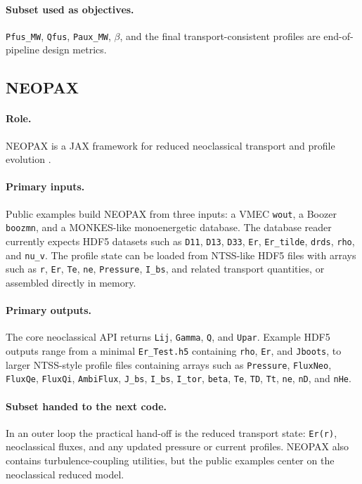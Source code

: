 \documentclass[11pt]{article}
\newcommand{\code}[1]{\texttt{#1}}
\begin{document}
\paragraph{Subset used as objectives.}
\code{Pfus\_MW}, \code{Qfus}, \code{Paux\_MW}, \(\beta\), and the final
transport-consistent profiles are end-of-pipeline design metrics.

\subsection{NEOPAX}

\paragraph{Role.}
NEOPAX is a JAX framework for reduced neoclassical transport and profile
evolution \citep{NEOPAXRepo}.

\paragraph{Primary inputs.}
Public examples build NEOPAX from three inputs: a VMEC \code{wout}, a Boozer
\code{boozmn}, and a MONKES-like monoenergetic database. The database reader
currently expects HDF5 datasets such as \code{D11}, \code{D13}, \code{D33},
\code{Er}, \code{Er\_tilde}, \code{drds}, \code{rho}, and \code{nu\_v}. The
profile state can be loaded from NTSS-like HDF5 files with arrays such as
\code{r}, \code{Er}, \code{Te}, \code{ne}, \code{Pressure}, \code{I\_bs}, and
related transport quantities, or assembled directly in memory.

\paragraph{Primary outputs.}
The core neoclassical API returns \code{Lij}, \code{Gamma}, \code{Q}, and
\code{Upar}. Example HDF5 outputs range from a minimal \code{Er\_Test.h5}
containing \code{rho}, \code{Er}, and \code{Jboots}, to larger NTSS-style
profile files containing arrays such as \code{Pressure}, \code{FluxNeo},
\code{FluxQe}, \code{FluxQi}, \code{AmbiFlux}, \code{J\_bs}, \code{I\_bs},
\code{I\_tor}, \code{beta}, \code{Te}, \code{TD}, \code{Tt}, \code{ne},
\code{nD}, and \code{nHe}.

\paragraph{Subset handed to the next code.}
In an outer loop the practical hand-off is the reduced transport state:
\code{Er(r)}, neoclassical fluxes, and any updated pressure or current
profiles. NEOPAX also contains turbulence-coupling utilities, but the public
examples center on the neoclassical reduced model.
\end{document}
